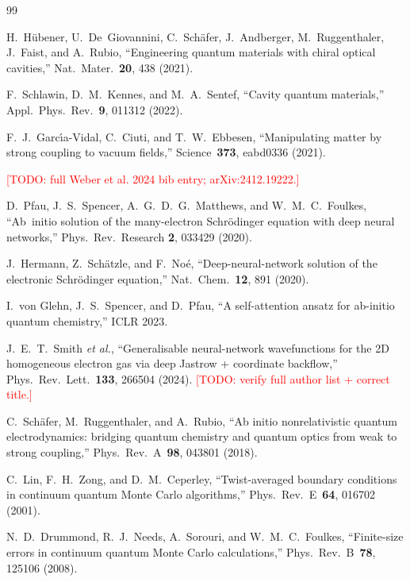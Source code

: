 \documentclass[reprint,amsmath,amssymb,aps,prb,floatfix,nofootinbib]{revtex4-2}
\newcommand{\todo}[1]{\textcolor{red}{[TODO: #1]}}
\begin{document}
\begin{thebibliography}{99}

H.~H\"ubener, U.~De~Giovannini, C.~Sch\"afer, J.~Andberger, M.~Ruggenthaler,
J.~Faist, and A.~Rubio,
``Engineering quantum materials with chiral optical cavities,''
Nat.~Mater.~\textbf{20}, 438 (2021).

F.~Schlawin, D.~M.~Kennes, and M.~A.~Sentef,
``Cavity quantum materials,''
Appl.~Phys.~Rev.~\textbf{9}, 011312 (2022).

F.~J.~Garc\'\i a-Vidal, C.~Ciuti, and T.~W.~Ebbesen,
``Manipulating matter by strong coupling to vacuum fields,''
Science~\textbf{373}, eabd0336 (2021).

\todo{full Weber et al. 2024 bib entry; arXiv:2412.19222.}

D.~Pfau, J.~S.~Spencer, A.~G.~D.~G.~Matthews, and W.~M.~C.~Foulkes,
``Ab~initio solution of the many-electron Schr\"odinger equation with
deep neural networks,''
Phys.~Rev.~Research \textbf{2}, 033429 (2020).

J.~Hermann, Z.~Sch\"atzle, and F.~No\'e,
``Deep-neural-network solution of the electronic Schr\"odinger
equation,''
Nat.~Chem.~\textbf{12}, 891 (2020).

I.~von Glehn, J.~S.~Spencer, and D.~Pfau,
``A self-attention ansatz for ab-initio quantum chemistry,''
ICLR 2023.

J.~E.~T.~Smith \emph{et al.},
``Generalisable neural-network wavefunctions for the 2D homogeneous
electron gas via deep Jastrow + coordinate backflow,''
Phys.~Rev.~Lett.~\textbf{133}, 266504 (2024).
\todo{verify full author list + correct title.}

C.~Sch\"afer, M.~Ruggenthaler, and A.~Rubio,
``Ab initio nonrelativistic quantum electrodynamics: bridging quantum
chemistry and quantum optics from weak to strong coupling,''
Phys.~Rev.~A~\textbf{98}, 043801 (2018).

C.~Lin, F.~H.~Zong, and D.~M.~Ceperley,
``Twist-averaged boundary conditions in continuum quantum Monte Carlo
algorithms,''
Phys.~Rev.~E~\textbf{64}, 016702 (2001).

N.~D.~Drummond, R.~J.~Needs, A.~Sorouri, and W.~M.~C.~Foulkes,
``Finite-size errors in continuum quantum Monte Carlo calculations,''
Phys.~Rev.~B~\textbf{78}, 125106 (2008).


\end{thebibliography}
\end{document}
